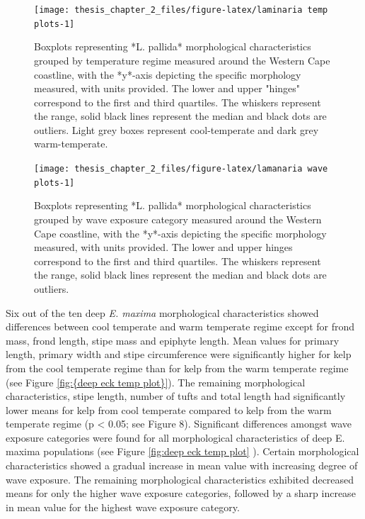\documentclass[
  a4paper,
]{article}
\begin{document}
\begin{figure}

{\centering \texttt{[image: thesis\_chapter\_2\_files/figure-latex/laminaria temp plots-1]} 

}

\caption{\label{fig:lamanaria temp plots}Boxplots representing *L. pallida* morphological characteristics grouped by temperature regime measured around the Western Cape coastline, with the *y*-axis depicting the specific morphology measured, with units provided. The lower and upper "hinges" correspond to the first and third quartiles. The whiskers represent the range, solid black lines represent the median and black dots are outliers. Light grey boxes represent cool-temperate and dark grey warm-temperate.}\label{fig:laminaria temp plots}
\end{figure}

\begin{figure}

{\centering \texttt{[image: thesis\_chapter\_2\_files/figure-latex/lamanaria wave plots-1]} 

}

\caption{\label{fig:lamanaria wave plots}Boxplots representing *L. pallida* morphological characteristics grouped by wave exposure category measured around the Western Cape coastline, with the *y*-axis depicting the specific morphology measured, with units provided. The lower and upper hinges correspond to the first and third quartiles. The whiskers represent the range, solid black lines represent the median and black dots are outliers.}\label{fig:lamanaria wave plots}
\end{figure}

Six out of the ten deep \emph{E. maxima} morphological characteristics
showed differences between cool temperate and warm temperate regime
except for frond mass, frond length, stipe mass and epiphyte length.
Mean values for primary length, primary width and stipe circumference
were significantly higher for kelp from the cool temperate regime than
for kelp from the warm temperate regime (see Figure
\ref{fig:{deep eck temp plot}}). The remaining morphological
characteristics, stipe length, number of tufts and total length had
significantly lower means for kelp from cool temperate compared to kelp
from the warm temperate regime (p \textless{} 0.05; see Figure 8).
Significant differences amongst wave exposure categories were found for
all morphological characteristics of deep E. maxima populations (see
Figure \ref{fig:deep eck temp plot} ). Certain morphological
characteristics showed a gradual increase in mean value with increasing
degree of wave exposure. The remaining morphological characteristics
exhibited decreased means for only the higher wave exposure categories,
followed by a sharp increase in mean value for the highest wave exposure
category.
\end{document}
